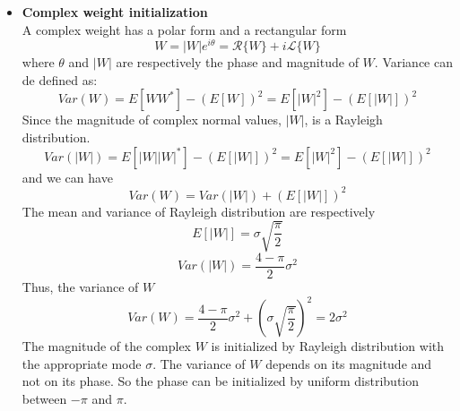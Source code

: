 \documentclass[11pt]{report}
\begin{document}
    \begin{itemize}
    	\item \textbf{Complex weight initialization}\\
    	A complex weight has a polar form and a rectangular form
    	\begin{equation}
    	W = |W|e^{i\theta} = \mathcal{R}\{W\}+i\mathcal{L}\{W\}
    	\end{equation}
    	where $\theta$ and $|W|$ are respectively the phase and magnitude of $W$.
    	Variance can de defined as:
    	\begin{equation}
    	Var(W) = E[WW^*] - (E[W])^2 = E[|W|^2] - (E[|W|])^2
    	\end{equation}
    	Since the magnitude of complex normal values, $|W|$, is a Rayleigh distribution.
    	\begin{equation}
    	Var(|W|) = E[|W||W|^*]-(E[|W|])^2 = E[|W|^2]-(E[|W|])^2
    	\end{equation}
    	and we can have
    	\begin{equation}
    	Var(W) = Var(|W|) + (E[|W|])^2
    	\end{equation}
    	The mean and variance of Rayleigh distribution are respectively
    	\begin{equation}
    	E[|W|] = \sigma \sqrt{\frac{\pi}{2}}
    	\end{equation}
    	\begin{equation}
    	Var(|W|) = \frac{4-\pi}{2}\sigma^2
    	\end{equation}
    	Thus, the variance of $W$
    	\begin{equation}
    	Var(W) = \frac{4-\pi}{2}\sigma ^2 + \left(\sigma \sqrt{\frac{\pi}{2}}\right)^2 = 2 \sigma^2
    	\end{equation}
    	The magnitude of the complex $W$ is initialized by Rayleigh distribution with the appropriate mode $\sigma$. The variance of $W$ depends on its magnitude and not on its phase. So the phase can be initialized by uniform distribution between $-\pi$ and $\pi$. 
    \end{itemize}
\end{document}
